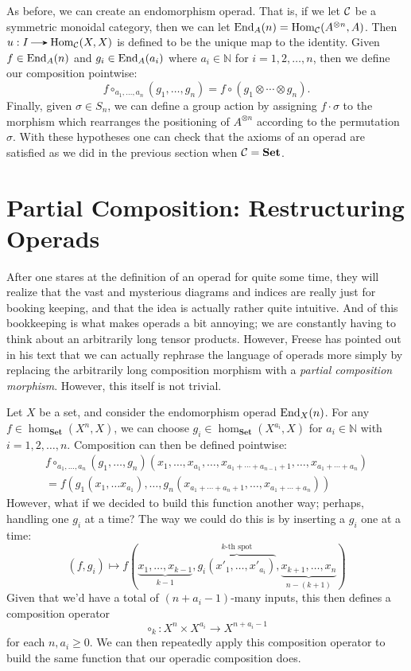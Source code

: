 \begin{example}
    As before, we can create an endomorphism operad. That is, if we let $\mathcal{C}$ 
    be a symmetric monoidal category, then we can let $\operatorname{\mathrm{End}}_A(n) = \operatorname{\mathrm{Hom}}_{\mathcal{C}}(A^{\otimes n}, A)$. 
    Then $u: I \to \hom_{\cc}(X, X)$ is defined to be the unique map to the identity.
    Given $f \in \operatorname{\mathrm{End}}_A(n)$ and $g_i \in \operatorname{\mathrm{End}}_A(a_i)$ where $a_i \in \mathbb{N}$ for $i = 1,2, \dots, n$, 
    then we define our composition pointwise: 
    \[
        f \circ_{a_1, \dots, a_n}(g_1, \dots, g_n) = f \circ (g_1 \otimes \cdots \otimes g_n).
    \]
    Finally, given $\sigma \in S_n$, we can define a group action by assigning 
    $f \cdot \sigma$ to the morphism which rearranges the positioning of 
    $A^{\otimes n}$ according to the permutation $\sigma$. With these hypotheses 
    one can check that the axioms of an operad are satisfied as we did in the previous section 
    when $\mathcal{C} = \textbf{Set}$. 
\end{example}


\newpage 
\section{Partial Composition: Restructuring Operads}
After one stares at the definition of an operad for quite some time, they 
will realize that the vast and mysterious diagrams and indices are really just 
for booking keeping, and that the idea is actually rather quite intuitive. 
And of this bookkeeping is what makes operads a bit annoying; we are 
constantly having to think about an arbitrarily long tensor products. 
However, Freese has pointed out in his text that we can actually rephrase the 
language of operads more simply by replacing the arbitrarily long 
composition morphism with a \emph{partial composition morphism}. However, this 
itself is not trivial. 

Let $X$ be a set, and consider the endomorphism operad $\operatorname{\mathrm{End}}_X(n)$. 
For any $f \in \hom_{\textbf{Set}}(X^n, X)$, we can choose $g_i \in \hom_{\textbf{Set}}(X^{a_i}, X)$ 
for $a_i \in \mathbb{N}$ with $i = 1, 2, \dots, n$. Composition can then be defined pointwise: 
\begin{gather*}
    f \circ_{a_1, \dots, a_n}(g_1, \dots, g_n)(x_1, \dots, x_{a_1}, \dots, x_{a_1 + \cdots + a_{n-1} +1}, \dots, x_{a_1 + \cdots + a_{n}})\\
    =
    f(g_1(x_1, \dots x_{a_1}), \dots, g_n(x_{a_1 + \cdots + a_n + 1}, \dots, x_{a_1 + \cdots + a_n}))
\end{gather*}
However, what if we decided to build this function another way; perhaps, handling 
one $g_i$ at a time? The way we could do this is by inserting a $g_i$ one at a time:
\[
    (f, g_i) \mapsto f(\underbrace{x_1, \dots, x_{k-1}}_{k-1}, \overbrace{g_i(x'_1, \dots, x'_{a_i})}^{k\text{-th spot}}, \underbrace{x_{k+1}, \dots, x_n}_{n-(k+1)})  
\]
Given that we'd have a total of $(n + a_i  -1)$-many inputs, this then defines a composition 
operator 
\[
    \circ_k: X^n \times X^{a_i} \to X^{n + a_i - 1}
\]
for each $n, a_i \ge 0$. We can then repeatedly apply this composition operator to build 
the same function that our operadic composition does. 

